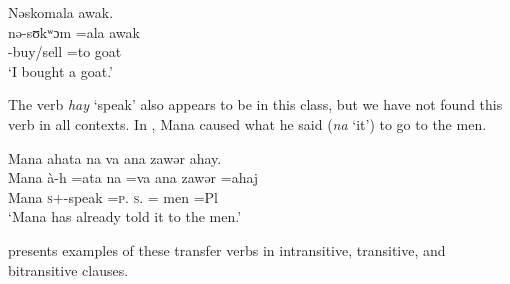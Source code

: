 \ea \label{ex:9:41}
Nəskomala  awak.\\
\gll  nə-sʊkʷɔm =ala   awak\\
      {\oneS}-buy/sell  =to  goat\\
\glt  ‘I bought a goat.’ 
\z

The verb \textit{hay} ‘speak’ also appears to be in this class, but we have not found this verb in all contexts. In , Mana caused what he said (\textit{na} ‘it’) to go to the men.  

\ea \label{ex:9:42}
Mana  ahata  na  va  ana  zawər  ahay.\\
\gll  Mana   à-h    =ata   na   =va   ana   zawər   =ahaj\\
      Mana  \textsc{s}+{\PFV}-speak  =\textsc{p}.{\IO}  \textsc{s}.{\DO}  ={\PRF}  {\DAT} men  =Pl\\
\glt  ‘Mana has already told it to the men.’
\z

 presents examples of these transfer verbs in intransitive, transitive, and bitransitive clauses.

